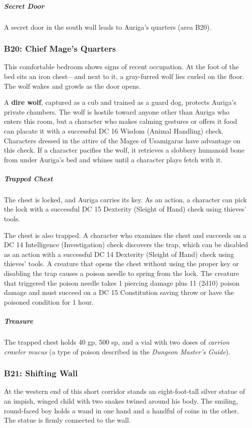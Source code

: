 \documentclass[10pt,a4paper,twoside,bg=print,twocolumn,openany,nodeprecatedcode]{dndbook}
\begin{document}
\subparagraph{Secret Door}
A secret door in the south wall leads to Auriga's quarters (area B20).

\subsubsection{B20: Chief Mage's Quarters}
\begin{DndReadAloud}{}
This comfortable bedroom shows signs of recent occupation. At the foot of the bed sits an iron chest—and next to it, a gray-furred wolf lies curled on the floor. The wolf wakes and growls as the door opens.

\end{DndReadAloud}

A \textbf{dire wolf}, captured as a cub and trained as a guard dog, protects Auriga's private chambers. The wolf is hostile toward anyone other than Auriga who enters this room, but a character who makes calming gestures or offers it food can placate it with a successful DC 16 Wisdom (Animal Handling) check. Characters dressed in the attire of the Mages of Usamigaras have advantage on this check. If a character pacifies the wolf, it retrieves a slobbery humanoid bone from under Auriga's bed and whines until a character plays fetch with it.

\subparagraph{Trapped Chest}
The chest is locked, and Auriga carries its key. As an action, a character can pick the lock with a successful DC 15 Dexterity (Sleight of Hand) check using thieves' tools.

The chest is also trapped. A character who examines the chest and succeeds on a DC 14 Intelligence (Investigation) check discovers the trap, which can be disabled as an action with a successful DC 14 Dexterity (Sleight of Hand) check using thieves' tools. A creature that opens the chest without using the proper key or disabling the trap causes a poison needle to spring from the lock. The creature that triggered the poison needle takes 1 piercing damage plus 11 (2d10) poison damage and must succeed on a DC 15 Constitution saving throw or have the poisoned condition for 1 hour.

\subparagraph{Treasure}
The trapped chest holds 40 gp, 500 sp, and a vial with two doses of \textit{carrion crawler mucus} (a type of poison described in the \textit{Dungeon Master's Guide}).

\subsubsection{B21: Shifting Wall}
\begin{DndReadAloud}{}
At the western end of this short corridor stands an eight-foot-tall silver statue of an impish, winged child with two snakes twined around his body. The smiling, round-faced boy holds a wand in one hand and a handful of coins in the other. The statue is firmly connected to the wall.

\end{DndReadAloud}
\end{document}
